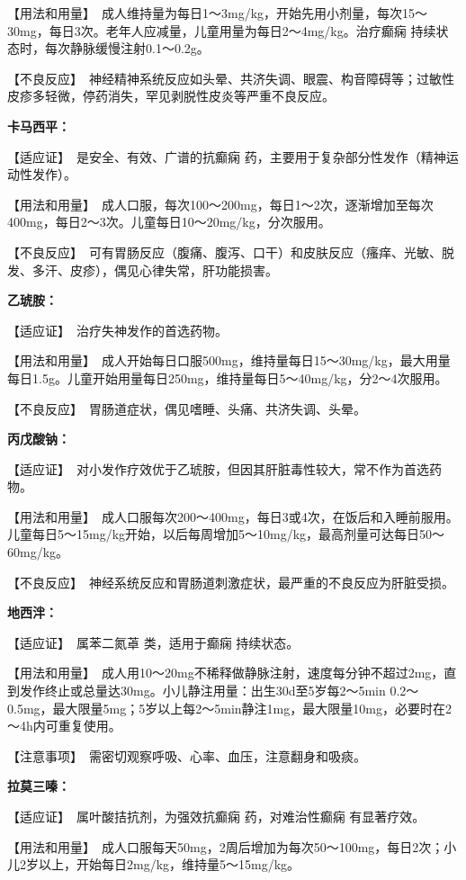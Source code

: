 【用法和用量】　成人维持量为每日1～3mg/kg，开始先用小剂量，每次15～30mg，每日3次。老年人应减量，儿童用量为每日2～4mg/kg。治疗癫痫
持续状态时，每次静脉缓慢注射0.1～0.2g。

【不良反应】　神经精神系统反应如头晕、共济失调、眼震、构音障碍等；过敏性皮疹多轻微，停药消失，罕见剥脱性皮炎等严重不良反应。

\textbf{卡马西平：}

【适应证】　是安全、有效、广谱的抗癫痫
药，主要用于复杂部分性发作（精神运动性发作）。

【用法和用量】　成人口服，每次100～200mg，每日1～2次，逐渐增加至每次400mg，每日2～3次。儿童每日10～20mg/kg，分次服用。

【不良反应】　可有胃肠反应（腹痛、腹泻、口干）和皮肤反应（瘙痒、光敏、脱发、多汗、皮疹），偶见心律失常，肝功能损害。

\textbf{乙琥胺：}

【适应证】　治疗失神发作的首选药物。

【用法和用量】　成人开始每日口服500mg，维持量每日15～30mg/kg，最大用量每日1.5g。儿童开始用量每日250mg，维持量每日5～40mg/kg，分2～4次服用。

【不良反应】　胃肠道症状，偶见嗜睡、头痛、共济失调、头晕。

\textbf{丙戊酸钠：}

【适应证】　对小发作疗效优于乙琥胺，但因其肝脏毒性较大，常不作为首选药物。

【用法和用量】　成人口服每次200～400mg，每日3或4次，在饭后和入睡前服用。儿童每日5～15mg/kg开始，以后每周增加5～10mg/kg，最高剂量可达每日50～60mg/kg。

【不良反应】　神经系统反应和胃肠道刺激症状，最严重的不良反应为肝脏受损。

\textbf{地西泮：}

【适应证】　属苯二氮䓬
类，适用于癫痫 持续状态。

【用法和用量】　成人用10～20mg不稀释做静脉注射，速度每分钟不超过2mg，直到发作终止或总量达30mg。小儿静注用量：出生30d至5岁每2～5min
0.2～0.5mg，最大限量5mg；5岁以上每2～5min静注1mg，最大限量10mg，必要时在2～4h内可重复使用。

【注意事项】　需密切观察呼吸、心率、血压，注意翻身和吸痰。

\textbf{拉莫三嗪：}

【适应证】　属叶酸拮抗剂，为强效抗癫痫
药，对难治性癫痫 有显著疗效。

【用法和用量】　成人口服每天50mg，2周后增加为每次50～100mg，每日2次；小儿2岁以上，开始每日2mg/kg，维持量5～15mg/kg。


